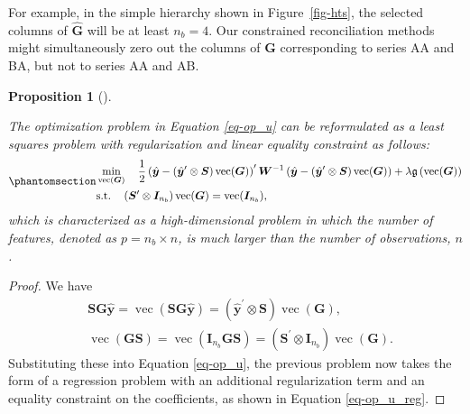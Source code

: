 \documentclass[
  11pt]{article}
\theoremstyle{plain}
\newtheorem{proposition}{Proposition}[section]
\theoremstyle{remark}
\begin{document}
For example, in the simple hierarchy shown in Figure~\ref{fig-hts}, the
selected columns of \(\hat{\bm{G}}\) will be at least \(n_b=4\). Our
constrained reconciliation methods might simultaneously zero out the
columns of \(\bm{G}\) corresponding to series AA and BA, but not to
series AA and AB.

\begin{proposition}[]\protect\hypertarget{prp-2}{}\label{prp-2}

The optimization problem in Equation \eqref{eq-op_u} can be reformulated
as a least squares problem with regularization and linear equality
constraint as follows:
\begin{equation}\phantomsection\label{eq-op_u_reg}{
\begin{aligned}
& \min_{\operatorname{vec}(\bm{G})} \quad \frac{1}{2}\left(\hat{\bm{y}}-\left(\hat{\bm{y}}^{\prime} \otimes \bm{S}\right) \operatorname{vec}(\bm{G})\right)^{\prime} \bm{W}^{-1}\left(\hat{\bm{y}}-\left(\hat{\bm{y}}^{\prime} \otimes \bm{S}\right) \operatorname{vec}(\bm{G})\right) + \lambda\mathfrak{g}\left(\operatorname{vec}(\bm{G})\right) \\
& \text{s.t.} \quad \left(\bm{S}^{\prime} \otimes \bm{I}_{n_b}\right) \operatorname{vec}(\bm{G})=\operatorname{vec}(\bm{I}_{n_b}),
\end{aligned}
}\end{equation} which is characterized as a high-dimensional problem in
which the number of features, denoted as \(p = n_b \times n\), is much
larger than the number of observations, \(n\).

\end{proposition}

\begin{proof}
We have\vspace*{-0.4cm}\enlargethispage{0.4cm} \[
\begin{aligned}
& \bm{SG}\hat{\bm{y}} = \operatorname{vec}\left(\bm{SG}\hat{\bm{y}}\right) = \left(\hat{\bm{y}}^{\prime} \otimes \bm{S}\right) \operatorname{vec}(\bm{G}), \\
& \operatorname{vec}\left(\bm{G}\bm{S}\right) = \operatorname{vec}\left(\bm{I}_{n_b}\bm{G}\bm{S}\right) = \left(\bm{S}^{\prime} \otimes \bm{I}_{n_b}\right) \operatorname{vec}(\bm{G}).
\end{aligned}
\] Substituting these into Equation \eqref{eq-op_u}, the previous
problem now takes the form of a regression problem with an additional
regularization term and an equality constraint on the coefficients, as
shown in Equation \eqref{eq-op_u_reg}.
\end{proof}
\end{document}
